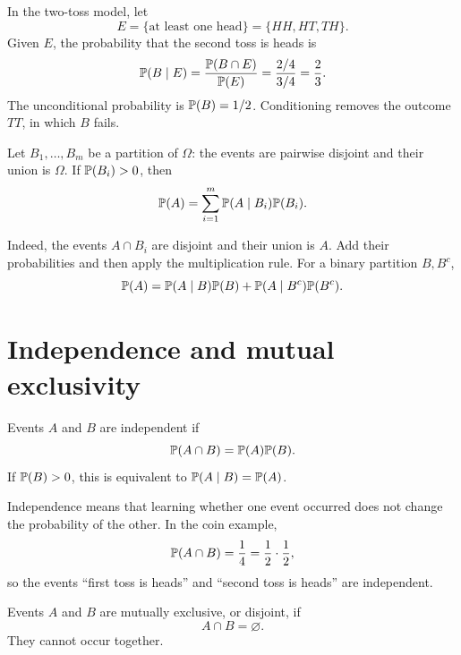 \begin{example}
In the two-toss model, let
\[
  E=\{\text{at least one head}\}=\{HH,HT,TH\}.
\]
Given \(E\), the probability that the second toss is heads is
\[
  \mathbb{P}(B\mid E)
  =\frac{\mathbb{P}(B\cap E)}{\mathbb{P}(E)}
  =\frac{2/4}{3/4}=\frac23.
\]
The unconditional probability is \(\mathbb{P}(B)=1/2\). Conditioning removes the
outcome \(TT\), in which \(B\) fails.
\end{example}

\begin{theorem}
Let \(B_1,\ldots,B_m\) be a partition of \(\Omega\): the events are pairwise
disjoint and their union is \(\Omega\). If \(\mathbb{P}(B_i)>0\), then
\begin{equation}
  \mathbb{P}(A)=\sum_{i=1}^{m}\mathbb{P}(A\mid B_i)\mathbb{P}(B_i).
  \label{eq:total-probability}
\end{equation}
\end{theorem}

Indeed, the events \(A\cap B_i\) are disjoint and their union is \(A\). Add
their probabilities and then apply the multiplication rule. For a binary
partition \(B,B^c\),
\[
  \mathbb{P}(A)=\mathbb{P}(A\mid B)\mathbb{P}(B)
  +\mathbb{P}(A\mid B^c)\mathbb{P}(B^c).
\]

\section{Independence and mutual exclusivity}

\begin{definition}[Independence]
Events \(A\) and \(B\) are independent if
\begin{equation}
  \mathbb{P}(A\cap B)=\mathbb{P}(A)\mathbb{P}(B).
  \label{eq:independence}
\end{equation}
If \(\mathbb{P}(B)>0\), this is equivalent to
\(\mathbb{P}(A\mid B)=\mathbb{P}(A)\).
\end{definition}

Independence means that learning whether one event occurred does not change the
probability of the other. In the coin example,
\[
  \mathbb{P}(A\cap B)=\frac14=\frac12\cdot\frac12,
\]
so the events ``first toss is heads'' and ``second toss is heads'' are
independent.

\begin{definition}
Events \(A\) and \(B\) are mutually exclusive, or disjoint, if
\[
  A\cap B=\varnothing.
\]
They cannot occur together.
\end{definition}

